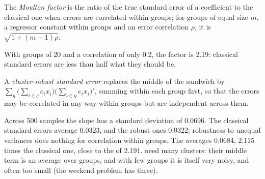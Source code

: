 \begin{definition}\label{def:b2:regression-inference:moulton}
The \emph{Moulton factor} is the ratio of the true standard error of a coefficient to the classical
one when errors are correlated within groups; for groups of equal size $m$, a regressor constant within groups and an
error correlation $\rho$, it is $\sqrt{1 + (m - 1)\rho}$.
\end{definition}

With groups of 20 and a correlation of only 0.2, the factor is 2.19: classical standard errors are less than half what
they should be.

\begin{definition}\label{def:b2:regression-inference:cluster-se}
A \emph{cluster-robust standard error} replaces the middle of the sandwich by
$\sum_g\bigl(\sum_{i \in g}e_ix_i\bigr)\bigl(\sum_{i \in g}e_ix_i\bigr)'$, summing within each group first, so that the
errors may be correlated in any way within groups but are independent across them.
\end{definition}

\label{lst:b2:regression-inference:cluster}

\label{out:b2:regression-inference:cluster}

Across 500 samples the slope has a standard deviation of 0.0696. The classical standard errors average 0.0323, and the
robust ones 0.0322: robustness to unequal variances does nothing for correlation within groups. The
 averages 0.0684, 2.115 times the classical one, close to the  of 2.191.
 need many clusters: their middle term is an average over groups, and with few groups it is
itself very noisy, and often too small (the weekend problem has three).

